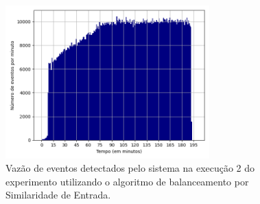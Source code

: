 


\begin{figure}[h]
\centering
\includegraphics[width=0.7\textwidth]{figuras/graphics/histogram_vazao_7-dez-is.png}
\caption{Vazão de eventos detectados pelo sistema na execução 2 do experimento utilizando o algoritmo de balanceamento por Similaridade de Entrada.}
\label{fig:vazao_7-dez-is}
\end{figure}



